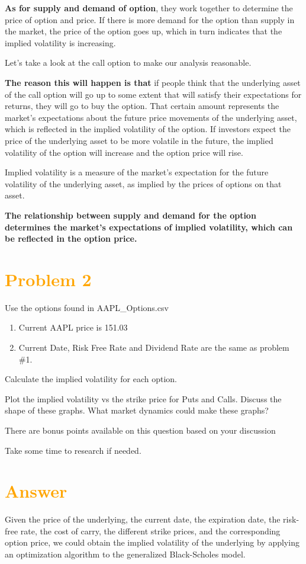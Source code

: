 \documentclass[11pt,en]{elegantpaper}
\begin{document}
\textbf{As for supply and demand of option}, they work together to determine the price of option and price. If there is more demand for the option than supply in the market, the price of the option goes up, which in turn indicates that the implied volatility is increasing.

Let's take a look at the call option to make our analysis reasonable.

\textbf{The reason this will happen is that} if people think that the underlying asset of the call option will go up to some extent that will satisfy their expectations for returns, they will go to buy the option. That certain amount represents the market's expectations about the future price movements of the underlying asset, which is reflected in the implied volatility of the option. If investors expect the price of the underlying asset to be more volatile in the future, the implied volatility of the option will increase and the option price will rise.

Implied volatility is a measure of the market's expectation for the future volatility of the underlying asset, as implied by the prices of options on that asset.

\textbf{The relationship between supply and demand for the option determines the market's expectations of implied volatility, which can be reflected in the option price.}


\section*{\textcolor{orange}{Problem 2}}
Use the options found in AAPL\_Options.csv
\begin{enumerate}
    \item Current AAPL price is 151.03
    \item Current Date, Risk Free Rate and Dividend Rate are the same as problem \#1.
\end{enumerate}

Calculate the implied volatility for each option.

Plot the implied volatility vs the strike price for Puts and Calls. Discuss the shape of these graphs. What market dynamics could make these graphs?

There are bonus points available on this question based on your discussion

Take some time to research if needed.
    
\section*{\textcolor{orange}{Answer}}
Given the price of the underlying, the current date, the expiration date, the risk-free rate, the cost of carry, the different strike prices, and the corresponding option price, we could obtain the implied volatility of the underlying by applying an optimization algorithm to the generalized Black-Scholes model.
\end{document}
